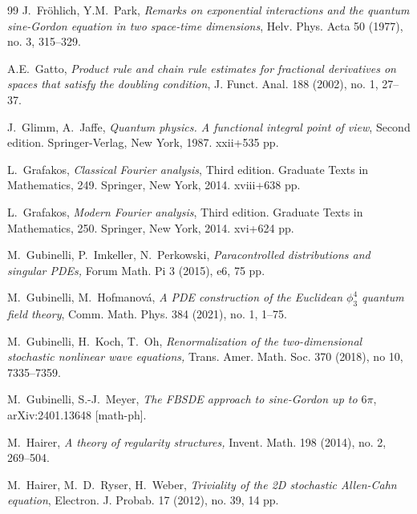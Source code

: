 \documentclass[letterpaper, 11pt,  reqno]{amsart}
\theoremstyle{myremark}
\newcommand{\1}{\hspace{0.5mm}\text{I}\hspace{0.5mm}}
\numberwithin{equation}{section}
\numberwithin{theorem}{section}
\begin{document}
\begin{thebibliography}{99}
J.~Fr\"ohlich, Y.M.~Park, 
{\it Remarks on exponential interactions and the quantum sine-Gordon equation in two space-time dimensions},
Helv. Phys. Acta 50 (1977), no. 3, 315--329. 

A.E.~Gatto,
{\it Product rule and chain rule estimates for fractional derivatives on spaces that satisfy the doubling condition},
J. Funct. Anal. 188 (2002), no. 1, 27–37.

J.~Glimm, A.~Jaffe,
{\it Quantum physics. A functional integral point of view},
Second edition. Springer-Verlag, New York, 1987. xxii+535 pp.
%


L.~Grafakos, 
{\it Classical Fourier analysis}, Third edition. Graduate Texts in Mathematics, 249. Springer, New York, 2014. xviii+638 pp. 



L.~Grafakos, 
{\it Modern Fourier analysis}, Third edition. Graduate Texts in Mathematics, 250. Springer, New York, 2014. xvi+624 pp.


M.~Gubinelli, P.~Imkeller, N.~Perkowski, 
{\it Paracontrolled distributions and singular PDEs,} Forum Math. Pi 3 (2015), e6, 75 pp. 


M.~Gubinelli, M.~Hofmanov\'a, 
{\it A PDE construction of the Euclidean $\phi^4_3$ quantum field theory},
Comm. Math. Phys. 384 (2021), no. 1, 1–75.



M.~Gubinelli, H.~Koch, T.~Oh,
{\it  Renormalization of the two-dimensional stochastic nonlinear wave equations,}
 Trans. Amer. Math. Soc.
 370 (2018), no 10, 7335--7359.


 
%

M.~Gubinelli, S.-J.~Meyer,
{\it The FBSDE approach to sine-Gordon up to $6\pi$},
arXiv:2401.13648 [math-ph].


M.~Hairer, 
{\it A theory of regularity structures,} Invent. Math. 198 (2014), no. 2, 269--504. 

M.~Hairer, M.~D.~Ryser, H.~Weber,
{\it Triviality of the 2D stochastic Allen-Cahn equation},
Electron. J. Probab. 17 (2012), no. 39, 14 pp. 



\end{thebibliography}
\end{document}
